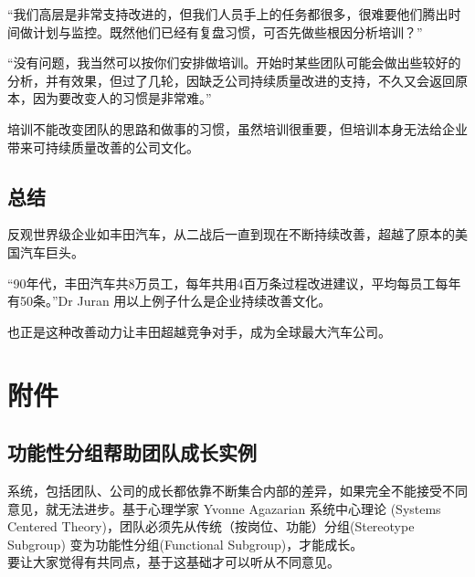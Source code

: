 ``我们高层是非常支持改进的，但我们人员手上的任务都很多，很难要他们腾出时间做计划与监控。既然他们已经有复盘习惯，可否先做些根因分析培训？''

``没有问题，我当然可以按你们安排做培训。开始时某些团队可能会做出些较好的分析，并有效果，但过了几轮，因缺乏公司持续质量改进的支持，不久又会返回原本，因为要改变人的习惯是非常难。''

培训不能改变团队的思路和做事的习惯，虽然培训很重要，但培训本身无法给企业带来可持续质量改善的公司文化。

\hypertarget{ux603bux7ed3}{%
\subsection{总结}\label{ux603bux7ed3}}

反观世界级企业如丰田汽车，从二战后一直到现在不断持续改善，超越了原本的美国汽车巨头。

``90年代，丰田汽车共8万员工，每年共用4百万条过程改进建议，平均每员工每年有50条。''Dr
Juran 用以上例子什么是企业持续改善文化。

也正是这种改善动力让丰田超越竞争对手，成为全球最大汽车公司。

\hypertarget{ux9644ux4ef6}{%
\section{附件}\label{ux9644ux4ef6}}

\hypertarget{ux529fux80fdux6027ux5206ux7ec4ux5e2eux52a9ux56e2ux961fux6210ux957fux5b9eux4f8b}{%
\subsection{功能性分组帮助团队成长实例}\label{ux529fux80fdux6027ux5206ux7ec4ux5e2eux52a9ux56e2ux961fux6210ux957fux5b9eux4f8b}}

系统，包括团队、公司的成长都依靠不断集合内部的差异，如果完全不能接受不同意见，就无法进步。基于心理学家
Yvonne Agazarian 系统中心理论 (Systems Centered
Theory)，团队必须先从传统（按岗位、功能）分组(Stereotype Subgroup)
变为功能性分组(Functional Subgroup)，才能成长。\\
要让大家觉得有共同点，基于这基础才可以听从不同意见。

